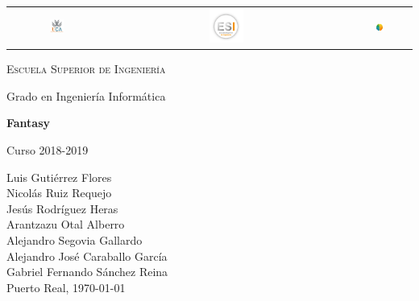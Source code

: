 \documentclass{book}
\newenvironment{changemargin}[2]{%
	\begin{list}{}{%
			\setlength{\topsep}{0pt}%
			\setlength{\leftmargin}{#1}%
			\setlength{\rightmargin}{#2}%
			\setlength{\listparindent}{\parindent}%
			\setlength{\itemindent}{\parindent}%
			\setlength{\parsep}{\parskip}%
		}%
		\item[]}{\end{list}}
\begin{document}
\begin{titlepage}
	\centering

\begin{table}[htb]
				\centering
				\begin{tabular}{ccc}
					\includegraphics[width=0.15\textwidth]{UCA.png}\par\vspace{0.2cm} & \includegraphics[width=0.15\textwidth]{ESI.png}\par\vspace{0.2cm} & \includegraphics[width=0.15\textwidth]{Stimey.png}\par\vspace{0.2cm}
				\end{tabular}
			\end{table}
	
	
	\begin{changemargin}{3em}{3em}
		\centering
		
		{\LARGE \textsc{\nohyphens{Escuela Superior de Ingeniería}}}
		
		\bigskip
		\bigskip
		\bigskip
		\bigskip
		
		{\LARGE \nohyphens{Grado en Ingeniería Informática}}
		
		\bigskip
		\bigskip
		\bigskip
		\bigskip
		\bigskip
		
		{\LARGE \nohyphens{\textbf{Fantasy}}}
		
		\bigskip
		\bigskip
		\bigskip
		\bigskip
		
		{\large Curso 2018-2019}
		
		\bigskip
		\bigskip
		\bigskip
		\bigskip
		
	\end{changemargin}
	
	{\Large Luis Gutiérrez Flores\\
					Nicolás Ruiz Requejo\\
					Jesús Rodríguez Heras\\
					Arantzazu Otal Alberro\\
					Alejandro Segovia Gallardo\\
					Alejandro José Caraballo García\\
					Gabriel Fernando Sánchez Reina} \\
	\bigskip
	\bigskip 
	\bigskip 
	{\large Puerto Real, \today}
	
\end{titlepage}
\end{document}
